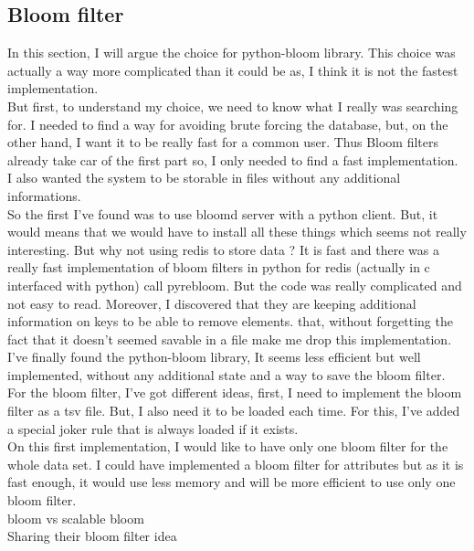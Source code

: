 \documentclass{eplmastersthesis}
\begin{document}
\subsection{Bloom filter}
In this section, I will argue the choice for python-bloom library. This choice was actually a way more complicated than it could be as, I think it is not the fastest implementation.\\
But first, to understand my choice, we need to know what I really was searching for. I needed to find a way for avoiding brute forcing the database, but, on the other hand, I want it to be really fast for a common user. Thus Bloom filters already take car of the first part so, I only needed to find a fast implementation.\\
I also wanted the system to be storable in files without any additional informations.\\
So the first I've found was to use bloomd server with a python client. But, it would means that we would have to install all these things which seems not really interesting. But why not using redis to store data ? It is fast and there was a really fast implementation of bloom filters in python for redis (actually in c interfaced with python) call pyrebloom. But the code was really complicated and not easy to read. Moreover, I discovered that they are keeping additional information on keys to be able to remove elements. that, without forgetting the fact that it doesn't seemed savable in a file make me drop this implementation.\\
I've finally found the python-bloom library, It seems less efficient but well implemented, without any additional state and a way to save the bloom filter.\\

For the bloom filter, I've got different ideas, first, I need to implement the bloom filter as a tsv file. But, I also need it to be loaded each time. For this, I've added a special joker rule that is always loaded if it exists.\\
On this first implementation, I would like to have only one bloom filter for the whole data set. I could have implemented a bloom filter for attributes but as it is fast enough, it would use less memory and will be more efficient to use only one bloom filter.\\

bloom vs scalable bloom \\

Sharing their bloom filter idea \\
\end{document}

